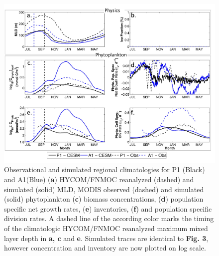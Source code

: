 \begin{figure}[!htbp]
\begin{adjustwidth}{-1in}{-1in}
 \centering
 \includegraphics[scale=.18]{figures/Ch2/Figure_7.jpg}
\end{adjustwidth}
\caption[Observational and simulated regional climatologies; Bins P1 and A1]{Observational and simulated regional climatologies for P1 (Black) and A1(Blue) (\textbf{a}) HYCOM/FNMOC reanalyzed (dashed) and simulated (solid) MLD, MODIS observed (dashed) and simulated (solid) phytoplankton (\textbf{c}) biomass concentrations, (\textbf{d}) population specific net growth rates, (\textbf{e}) inventories, (\textbf{f}) and population specific division rates. A dashed line of the according color marks the timing of the climatologic HYCOM/FNMOC reanalyzed maximum mixed layer depth in \textbf{a, c} and \textbf{e}. Simulated traces are identical to \textbf{Fig. 3}, however concentration and inventory are now plotted on log scale.}
\label{fig:Fig7}
\end{figure}



